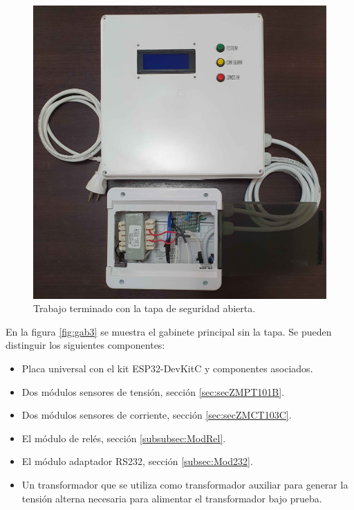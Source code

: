 \begin{figure}[h]
	\centering
	\includegraphics[scale=0.16]{./Figures/gab2.jpg}
	\caption{Trabajo terminado con la tapa de seguridad abierta.}
	\label{fig:gab2}
\end{figure}

\pagebreak

En la figura \ref{fig:gab3} se muestra el gabinete principal sin la tapa. Se pueden distinguir los siguientes componentes:

\begin{itemize}
\item Placa universal con el kit ESP32-DevKitC y componentes asociados.
\item Dos módulos sensores de tensión, sección \ref{sec:secZMPT101B}.
\item Dos módulos sensores de corriente, sección \ref{sec:secZMCT103C}.
\item El módulo de relés, sección \ref{subsubsec:ModRel}.
\item El módulo adaptador RS232, sección \ref {subsec:Mod232}.
\item Un transformador que se utiliza como transformador auxiliar para generar la tensión alterna necesaria para alimentar el transformador bajo prueba.
\end{itemize}

